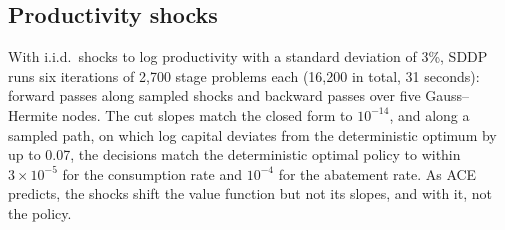 \subsection{Productivity shocks}

With i.i.d.\ shocks to log productivity with a standard deviation of 3\%, SDDP runs six iterations of 2{,}700 stage problems each (16{,}200 in total, 31 seconds): forward passes along sampled shocks and backward passes over five Gauss--Hermite nodes. The cut slopes match the closed form to $10^{-14}$, and along a sampled path, on which log capital deviates from the deterministic optimum by up to 0.07, the decisions match the deterministic optimal policy to within $3 \times 10^{-5}$ for the consumption rate and $10^{-4}$ for the abatement rate. As ACE predicts, the shocks shift the value function but not its slopes, and with it, not the policy.

